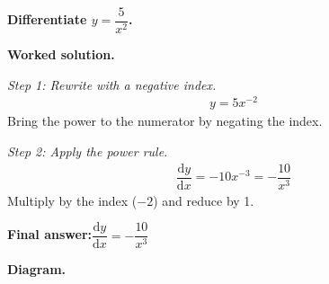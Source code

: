 \documentclass[11pt]{article}
\newcommand{\question}[1]{\par\medskip\noindent\textbf{#1}\par}
\begin{document}
\question{Differentiate \( y = \dfrac{5}{x^2} \).}

\textbf{Worked solution.}

\textit{Step 1: Rewrite with a negative index.}
\[\begin{gathered}
y = 5x^{-2}
\end{gathered}\]
Bring the power to the numerator by negating the index.

\textit{Step 2: Apply the power rule.}
\[\begin{gathered}
\dfrac{\mathrm{d}y}{\mathrm{d}x} = -10x^{-3} = -\dfrac{10}{x^3}
\end{gathered}\]
Multiply by the index (\( -2 \)) and reduce by 1.

\begin{answerbox}
\textbf{Final answer:}\quad \(\displaystyle  \dfrac{\mathrm{d}y}{\mathrm{d}x} = -\dfrac{10}{x^3} \)
\end{answerbox}
\textbf{Diagram.}
\end{document}

